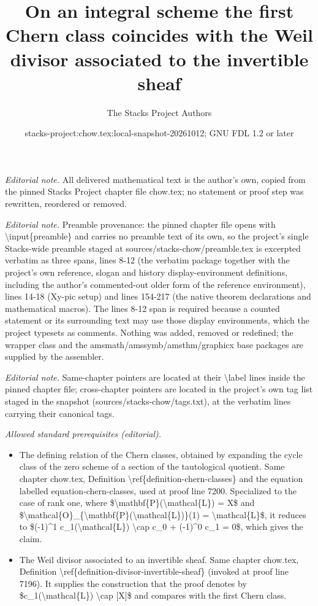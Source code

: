 \documentclass[10pt,a4paper]{amsart}
\title{On an integral scheme the first Chern class coincides with the Weil divisor associated to the invertible sheaf}
\author{The Stacks Project Authors}
\date{stacks-project:chow.tex:local-snapshot-20261012; GNU FDL 1.2 or later}
\theoremstyle{plain}
\theoremstyle{definition}
\theoremstyle{remark}
\numberwithin{equation}{subsection}
\begin{document}
\maketitle
\noindent\textit{Editorial note.} All delivered mathematical text is the author's own, copied from the pinned Stacks Project chapter file chow.tex; no statement or proof step was rewritten, reordered or removed.\par\medskip
\noindent\textit{Editorial note.} Preamble provenance: the pinned chapter file opens with \textbackslash{}input\{preamble\} and carries no preamble text of its own, so the project's single Stacks-wide preamble staged at sources/stacks-chow/preamble.tex is excerpted verbatim as three spans, lines 8-12 (the verbatim package together with the project's own reference, slogan and history display-environment definitions, including the author's commented-out older form of the reference environment), lines 14-18 (Xy-pic setup) and lines 154-217 (the native theorem declarations and mathematical macros). The lines 8-12 span is required because a counted statement or its surrounding text may use those display environments, which the project typesets as comments. Nothing was added, removed or redefined; the wrapper class and the amsmath/amssymb/amsthm/graphicx base packages are supplied by the assembler.\par\medskip
\noindent\textit{Editorial note.} Same-chapter pointers are located at their \textbackslash{}label lines inside the pinned chapter file; cross-chapter pointers are located in the project's own tag list staged in the snapshot (sources/stacks-chow/tags.txt), at the verbatim lines carrying their canonical tags.\par\medskip
\noindent\textit{Allowed standard prerequisites (editorial).}\begin{itemize}
\item The defining relation of the Chern classes, obtained by expanding the cycle class of the zero scheme of a section of the tautological quotient. Same chapter chow.tex, Definition \textbackslash{}ref\{definition-chern-classes\} and the equation labelled equation-chern-classes, used at proof line 7200. Specialized to the case of rank one, where \$\textbackslash{}mathbf\{P\}(\textbackslash{}mathcal\{L\}) = X\$ and \$\textbackslash{}mathcal\{O\}\_\{\textbackslash{}mathbf\{P\}(\textbackslash{}mathcal\{L\})\}(1) = \textbackslash{}mathcal\{L\}\$, it reduces to \$(-1)\textasciicircum{}1 c\_1(\textbackslash{}mathcal\{L\}) \textbackslash{}cap c\_0 + (-1)\textasciicircum{}0 c\_1 = 0\$, which gives the claim.
\item The Weil divisor associated to an invertible sheaf. Same chapter chow.tex, Definition \textbackslash{}ref\{definition-divisor-invertible-sheaf\} (invoked at proof line 7196). It supplies the construction that the proof denotes by \$c\_1(\textbackslash{}mathcal\{L\}) \textbackslash{}cap [X]\$ and compares with the first Chern class.
\end{itemize}\medskip
\end{document}
